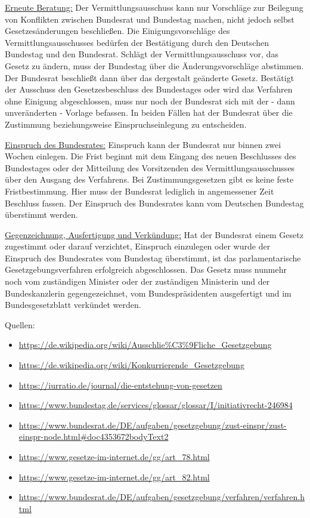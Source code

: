 \documentclass{article}
\begin{document}
\begin{enumerate}[label=(\alph*)]
		\underline{Erneute Beratung:} Der Vermittlungsausschuss kann nur Vorschläge zur Beilegung von Konflikten zwischen Bundesrat und Bundestag machen, nicht jedoch selbst Gesetzesänderungen beschließen. Die Einigungsvorschläge des Vermittlungsausschusses bedürfen der Bestätigung durch den Deutschen Bundestag und den Bundesrat. Schlägt der Vermittlungsausschuss vor, das Gesetz zu ändern, muss der Bundestag über die Änderungsvorschläge abstimmen. Der Bundesrat beschließt dann über das dergestalt geänderte Gesetz. Bestätigt der Ausschuss den Gesetzesbeschluss des Bundestages oder wird das Verfahren ohne Einigung abgeschlossen, muss nur noch der Bundesrat sich mit der - dann unveränderten - Vorlage befassen. In beiden Fällen hat der Bundesrat über die Zustimmung beziehungs\-weise Einspruchseinlegung zu entscheiden.
		
		\underline{Einspruch des Bundesrates:} Einspruch kann der Bundesrat nur binnen zwei Wochen einlegen. Die Frist beginnt mit dem Eingang des neuen Beschlusses des Bundestages oder der Mitteilung des Vorsitzenden des Vermittlungsausschusses über den Ausgang des Verfahrens. Bei Zustimmungsgesetzen gibt es keine feste Fristbestimmung. Hier muss der Bundesrat lediglich in angemessener Zeit Beschluss fassen. Der Einspruch des Bundesrates kann vom Deutschen Bundestag überstimmt werden.
		
		\underline{Gegenzeichnung, Ausfertigung und Verkündung:} Hat der Bundesrat einem Gesetz zugestimmt oder darauf verzichtet, Einspruch einzulegen oder wurde der Einspruch des Bundesrates vom Bundestag überstimmt, ist das parlamentarische Gesetzgebungsverfahren erfolgreich abgeschlossen. Das Gesetz muss nunmehr noch vom zuständigen Minister oder der zuständigen Ministerin und der Bundeskanzlerin gegengezeichnet, vom Bundespräsidenten ausgefertigt und im Bundesgesetzblatt verkündet werden.
	\end{enumerate}

	Quellen:
	\begin{itemize}
		\item \url{https://de.wikipedia.org/wiki/Ausschlie%C3%9Fliche_Gesetzgebung}
		\item \url{https://de.wikipedia.org/wiki/Konkurrierende_Gesetzgebung}
		\item \url{https://iurratio.de/journal/die-entstehung-von-gesetzen}
		\item \url{https://www.bundestag.de/services/glossar/glossar/I/initiativrecht-246984}
		\item \url{https://www.bundesrat.de/DE/aufgaben/gesetzgebung/zust-einspr/zust-einspr-node.html#doc4353672bodyText2}
		\item \url{https://www.gesetze-im-internet.de/gg/art_78.html}
		\item \url{https://www.gesetze-im-internet.de/gg/art_82.html}
		\item \url{https://www.bundesrat.de/DE/aufgaben/gesetzgebung/verfahren/verfahren.html}
	\end{itemize}
\end{document}
